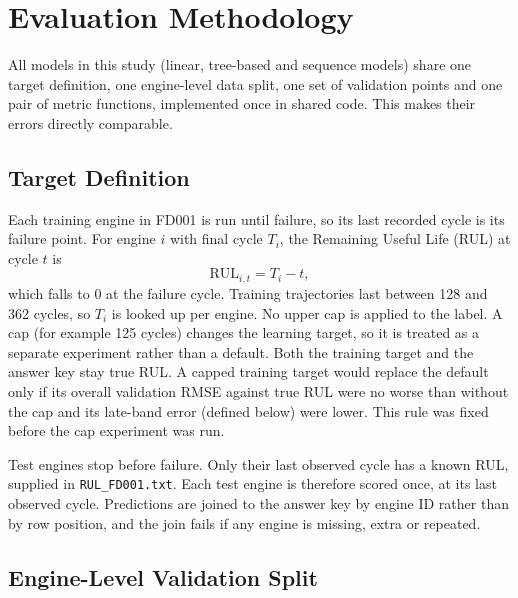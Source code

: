 
\section{Evaluation Methodology}
\label{sec:evaluation}

All models in this study (linear, tree-based and sequence models) share one
target definition, one engine-level data split, one set of validation points
and one pair of metric functions, implemented once in shared code. This makes
their errors directly comparable.

\subsection{Target Definition}

Each training engine in FD001 is run until failure, so its last recorded cycle
is its failure point. For engine $i$ with final cycle $T_i$, the Remaining
Useful Life (RUL) at cycle $t$ is
\begin{equation}
  \mathrm{RUL}_{i,t} = T_i - t ,
  \label{eq:rul}
\end{equation}
which falls to 0 at the failure cycle. Training trajectories last between 128
and 362 cycles, so $T_i$ is looked up per engine. No upper cap is applied to
the label. A cap (for example 125 cycles) changes the learning target, so it
is treated as a separate experiment rather than a default. Both the training
target and the answer key stay true RUL. A capped training target would
replace the default only if its overall validation RMSE against true RUL were
no worse than without the cap and its late-band error (defined below) were
lower. This rule was fixed before the cap experiment was run.

Test engines stop before failure. Only their last observed cycle has a known
RUL, supplied in \texttt{RUL\_FD001.txt}. Each test engine is therefore scored
once, at its last observed cycle. Predictions are joined to the answer key by
engine ID rather than by row position, and the join fails if any engine is
missing, extra or repeated.

\subsection{Engine-Level Validation Split}

